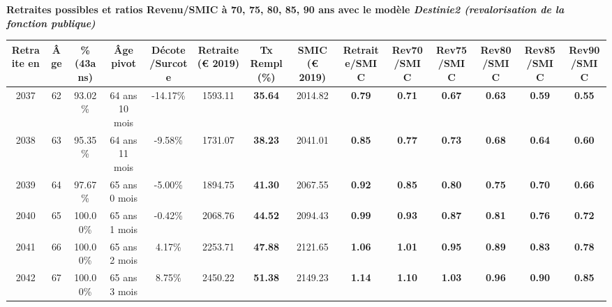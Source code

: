  \vspace{0.1cm} 
{\bf \noindent Retraites possibles et ratios Revenu/SMIC à 70, 75, 80, 85, 90 ans avec le modèle \emph{Destinie2 (revalorisation de la fonction publique)}}  
 
\begin{adjustbox}{max width=\textwidth} 
\begin{tabular}[htb]{|c|c||c|c|c||c|c||c||c|c|c|c|c|c|} 
\hline 
 Retraite en &  Âge &  \%(43ans) &  Âge pivot &  Décote/Surcote &  Retraite (\euro{} 2019) &  Tx Rempl(\%) &  SMIC (\euro{} 2019) &  Retraite/SMIC &  Rev70/SMIC &  Rev75/SMIC &  Rev80/SMIC &  Rev85/SMIC &  Rev90/SMIC \\ 
\hline \hline 
 2037 &  62 &  93.02\% &  64 ans 10 mois &  -14.17\% &  1593.11 &  {\bf 35.64} &  2014.82 &  {\bf {\color{red} 0.79}} &  {\bf {\color{red} 0.71}} &  {\bf {\color{red} 0.67}} &  {\bf {\color{red} 0.63}} &  {\bf {\color{red} 0.59}} &  {\bf {\color{red} 0.55}} \\ 
\hline 
 2038 &  63 &  95.35\% &  64 ans 11 mois &  -9.58\% &  1731.07 &  {\bf 38.23} &  2041.01 &  {\bf {\color{red} 0.85}} &  {\bf {\color{red} 0.77}} &  {\bf {\color{red} 0.73}} &  {\bf {\color{red} 0.68}} &  {\bf {\color{red} 0.64}} &  {\bf {\color{red} 0.60}} \\ 
\hline 
 2039 &  64 &  97.67\% &  65 ans 0 mois &  -5.00\% &  1894.75 &  {\bf 41.30} &  2067.55 &  {\bf {\color{red} 0.92}} &  {\bf {\color{red} 0.85}} &  {\bf {\color{red} 0.80}} &  {\bf {\color{red} 0.75}} &  {\bf {\color{red} 0.70}} &  {\bf {\color{red} 0.66}} \\ 
\hline 
 2040 &  65 &  100.00\% &  65 ans 1 mois &  -0.42\% &  2068.76 &  {\bf 44.52} &  2094.43 &  {\bf {\color{red} 0.99}} &  {\bf {\color{red} 0.93}} &  {\bf {\color{red} 0.87}} &  {\bf {\color{red} 0.81}} &  {\bf {\color{red} 0.76}} &  {\bf {\color{red} 0.72}} \\ 
\hline 
 2041 &  66 &  100.00\% &  65 ans 2 mois &  4.17\% &  2253.71 &  {\bf 47.88} &  2121.65 &  {\bf 1.06} &  {\bf 1.01} &  {\bf {\color{red} 0.95}} &  {\bf {\color{red} 0.89}} &  {\bf {\color{red} 0.83}} &  {\bf {\color{red} 0.78}} \\ 
\hline 
 2042 &  67 &  100.00\% &  65 ans 3 mois &  8.75\% &  2450.22 &  {\bf 51.38} &  2149.23 &  {\bf 1.14} &  {\bf 1.10} &  {\bf 1.03} &  {\bf {\color{red} 0.96}} &  {\bf {\color{red} 0.90}} &  {\bf {\color{red} 0.85}} \\ 
\hline 
\hline 
\end{tabular} 
\end{adjustbox} 
 
